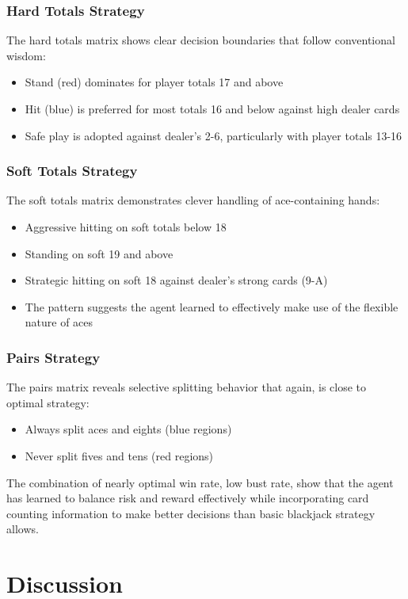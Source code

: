 \documentclass[10pt]{article}
\theoremstyle{definition}
\begin{document}
\subsubsection{Hard Totals Strategy}
The hard totals matrix shows clear decision boundaries that follow conventional wisdom:
\begin{itemize}
    \item Stand (red) dominates for player totals 17 and above
    \item Hit (blue) is preferred for most totals 16 and below against high dealer cards
    \item Safe play is adopted against dealer's 2-6, particularly with player totals 13-16
\end{itemize}

\subsubsection{Soft Totals Strategy}
The soft totals matrix demonstrates clever handling of ace-containing hands:
\begin{itemize}
    \item Aggressive hitting on soft totals below 18
    \item Standing on soft 19 and above
    \item Strategic hitting on soft 18 against dealer's strong cards (9-A)
    \item The pattern suggests the agent learned to effectively make use of the flexible nature of aces
\end{itemize}

\subsubsection{Pairs Strategy}
The pairs matrix reveals selective splitting behavior that again, is close to optimal strategy:
\begin{itemize}
    \item Always split aces and eights (blue regions)
    \item Never split fives and tens (red regions)
\end{itemize}
The combination of nearly optimal win rate, low bust rate, show that the agent has learned to balance risk and reward effectively while incorporating card counting information to make better decisions than basic blackjack strategy allows.
\section{Discussion}
\end{document}
